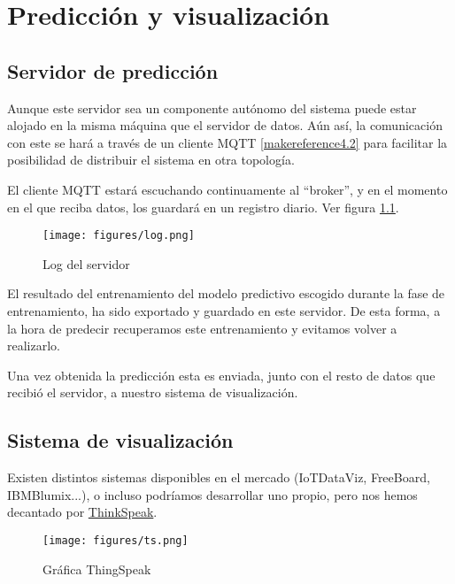 \cleardoublepage

\chapter{Predicción y visualización}
\label{makereference6}

\section{Servidor de predicción}

Aunque este servidor sea un componente autónomo del sistema puede estar alojado en la misma máquina que el servidor de datos. Aún así, la comunicación con este se hará a través de un cliente MQTT \ref{makereference4.2} para facilitar la posibilidad de distribuir el sistema en otra topología.

El cliente MQTT estará escuchando continuamente al ``broker'', y en el momento en el que reciba datos, los guardará en un registro diario. Ver figura \ref{log}.

	\begin{figure}[htb]
		\begin{center}
			\texttt{[image: figures/log.png]}
			\caption{Log del servidor \label{log}}
		\end{center}
	\end{figure}

El resultado del entrenamiento del modelo predictivo escogido durante la fase de entrenamiento, ha sido exportado y guardado en este servidor. De esta forma, a la hora de predecir recuperamos este entrenamiento y evitamos volver a realizarlo.

Una vez obtenida la predicción esta es enviada, junto con el resto de datos que recibió el servidor, a nuestro sistema de visualización. 

\section{Sistema de visualización}

Existen distintos sistemas disponibles en el mercado (IoTDataViz, FreeBoard, IBMBlumix...), o incluso podríamos desarrollar uno propio, pero nos hemos decantado por \href{https://thingspeak.com/}{ThinkSpeak}.

\begin{figure}[htb]
	\begin{center}
		\texttt{[image: figures/ts.png]}
		\caption{Gráfica ThingSpeak \label{ts}}
	\end{center}
\end{figure}

